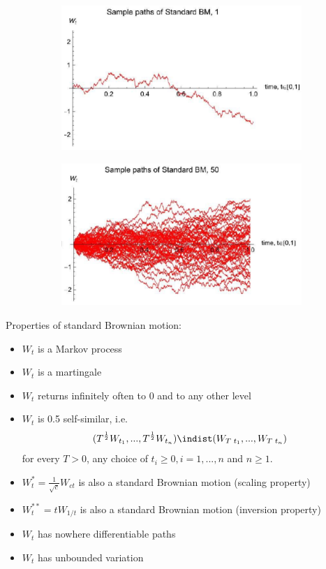 \documentclass[11pt,a4paper]{book}
\theoremstyle{definition}\newtheorem{definition}{Definition}
\theoremstyle{definition}\newtheorem{fact}{Fact}
\theoremstyle{definition}\newtheorem{remark}{Remark}
\theoremstyle{definition}\newtheorem{ex}{Ex.}
\theoremstyle{definition}\newtheorem{project}{Project}
\theoremstyle{definition}\newtheorem{problem}{Problem}
\theoremstyle{definition}\newtheorem{example}{Example}
\numberwithin{theorem}{section}
\numberwithin{corollary}{chapter}
\numberwithin{assumption}{chapter}
\numberwithin{definition}{chapter}
\numberwithin{prop}{chapter}
\numberwithin{notation}{chapter}
\numberwithin{problem}{chapter}
\numberwithin{example}{chapter}
\numberwithin{fact}{chapter}
\numberwithin{ex}{chapter}
\begin{document}
\begin{figure}[H]
	\begin{subfigure}{0.5\textwidth}
		\centering
		\includegraphics[scale=0.5]{Chapter 1/Chapter1_2.png}
	\end{subfigure}
	\begin{subfigure}{0.5\textwidth}
		\centering
		\includegraphics[scale=0.5]{Chapter 1/Chapter1_3.png}
	\end{subfigure}
\end{figure}

Properties of standard Brownian motion:
\begin{itemize}
\item $W_t$ is a Markov process
\item $W_t$ is a martingale
\item $W_t$ returns infinitely often to 0 and to any other level
\item $W_t$ is 0.5 self-similar, i.e.
$$ (T^{\frac{1}{2}} W_{t_1}, ..., T^{\frac{1}{2}} W_{t_n}) \indist (W_{T\,\,t_1}, ..., W_{T\,\,t_n}) $$
for every $T>0$, any choice of $t_i \geq 0, i = 1, ..., n$ and $n \geq 1$.
\item $W_t^* = \frac{1}{\sqrt{c}} W_{ct}$ is also a standard Brownian motion (scaling property)
\item $W_t^{{**}} = t W_{1/t}$ is also a standard Brownian motion (inversion property)
\item $W_t$ has nowhere differentiable paths
\item $W_t$ has unbounded variation
\end{itemize}
\end{document}
